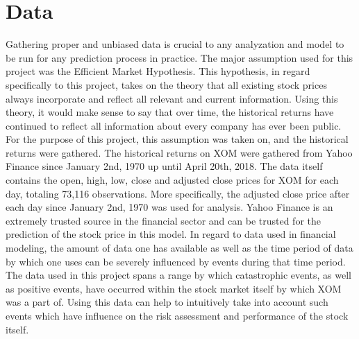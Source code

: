 \documentclass{article}
\begin{document}
\newpage
\section{Data}
Gathering proper and unbiased data is crucial to any analyzation and model to be run for any prediction process in practice. The major assumption used for this project was the Efficient Market Hypothesis. This hypothesis, in regard specifically to this project, takes on the theory that all existing stock prices always incorporate and reflect all relevant and current information. Using this theory, it would make sense to say that over time, the historical returns have continued to reflect all information about every company has ever been public. For the purpose of this project, this assumption was taken on, and the historical returns were gathered. The historical returns on XOM were gathered from Yahoo Finance since January 2nd, 1970 up until April 20th, 2018. The data itself contains the open, high, low, close and adjusted close prices for XOM for each day, totaling 73,116 observations. More specifically, the adjusted close price after each day since January 2nd, 1970 was used for analysis. Yahoo Finance is an extremely trusted source in the financial sector and can be trusted for the prediction of the stock price in this model. In regard to data used in financial modeling, the amount of data one has available as well as the time period of data by which one uses can be severely influenced by events during that time period. The data used in this project spans a range by which catastrophic events, as well as positive events, have occurred within the stock market itself by which XOM was a part of. Using this data can help to intuitively take into account such events which have influence on the risk assessment and performance of the stock itself.

\newpage
\end{document}

